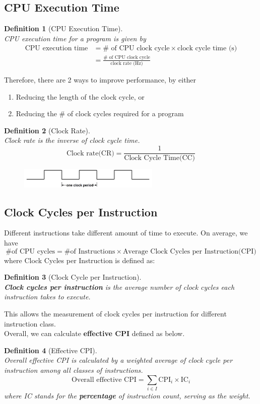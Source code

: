 \documentclass[12pt]{article}
\newtheorem{definition}{Definition}[section]
\theoremstyle{definition}
\begin{document}
\subsection{CPU Execution Time}
\begin{definition}[CPU Execution Time]
\hfill\\\normalfont CPU execution time for a program is given by
\begin{align*}
\text{CPU execution time} &= {\# \text{ of CPU clock cycle}}\times\text{clock cycle time (s)}\\
&=\frac{\#\text{ of CPU clock cycle}}{\text{clock rate (Hz)}}
\end{align*}
\end{definition}
Therefore, there are 2 ways to improve performance, by either
\begin{enumerate}
  \item Reducing the length of the clock cycle, or
  \item Reducing the \# of clock cycles required for a program
\end{enumerate}
\begin{definition}[Clock Rate]
\hfill\\\normalfont Clock rate is the inverse of clock cycle time.
\[
\text{Clock rate(CR)} = \frac{1}{\text{Clock Cycle Time(CC)}}
\]
\begin{figure}[h]
\centering
\includegraphics[width = 0.6\textwidth]{9_1.png}
\end{figure}
\end{definition}
\subsection{Clock Cycles per Instruction}
Different instructions take different amount of time to execute. On average, we have
\[
\text{\# of CPU cycles} = \text{\# of Instructions}\times\text{Average Clock Cycles per Instruction(CPI)}
\]
where Clock Cycles per Instruction is defined as:
\begin{definition}[Clock Cycle per Instruction]
\hfill\\\normalfont \textbf{Clock cycles per instruction} is the average number of clock cycles each instruction takes to execute.
\end{definition}
This allows the measurement of clock cycles per instruction for different instruction class. \\Overall, we can calculate \textbf{effective CPI} defined as below.
\begin{definition}[Effective CPI]
\hfill\\\normalfont Overall effective CPI is calculated by a weighted average of clock cycle per instruction among all classes of instructions.
\[
\text{Overall effective CPI} = \sum_{i\in I} \text{CPI}_i\times\text{IC}_i
\]
where IC stands for the \textbf{percentage} of instruction count, serving as the weight.
\end{definition}
\end{document}
